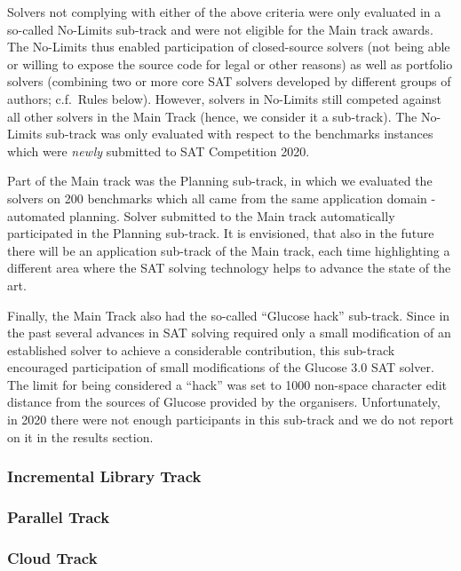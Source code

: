 \documentclass{elsarticle}
\begin{document}
Solvers not complying with either of the above criteria were only evaluated in a so-called No-Limits sub-track and were not eligible for the Main track awards. The No-Limits thus enabled participation of closed-source solvers (not being able or willing to expose the source code for legal or other reasons) as well as portfolio solvers (combining two or more core SAT solvers developed by different groups of authors; c.f.\ Rules below). However, solvers in No-Limits still competed against all other solvers in the Main Track (hence, we consider it a sub-track). The No-Limits sub-track was only evaluated with respect to the benchmarks instances which were \emph{newly} submitted to SAT Competition 2020.

Part of the Main track was the Planning sub-track, in which we evaluated the solvers on 200 benchmarks 
which all came from the same application domain - automated planning. 
Solver submitted to the Main track automatically participated in the Planning sub-track.
It is envisioned, that also in the future there will be an application sub-track of the Main track, each time highlighting a different area where the SAT solving technology helps to advance the state of the art.

Finally, the Main Track also had the so-called ``Glucose hack'' sub-track. 
Since in the past several advances in SAT solving required only a small modification of an established solver
to achieve a considerable contribution, this sub-track encouraged participation 
of small modifications of the Glucose 3.0 SAT solver. The limit for being considered a ``hack''
was set to 1000 non-space character edit distance from the sources of Glucose provided by the organisers. 
Unfortunately, in 2020 there were not enough participants in this sub-track and we do not report on it 
in the results section.

\subsubsection{Incremental Library Track}

\subsubsection{Parallel Track}

\subsubsection{Cloud Track}
\end{document}
